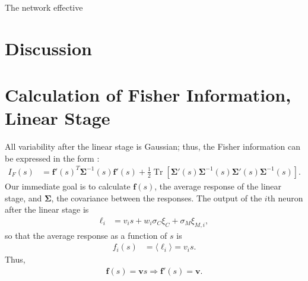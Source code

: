 \documentclass[11pt]{article}
\DeclareMathOperator{\Tr}{Tr}
\begin{document}
	The network effective

	\begin{figure}[b]
		\centering
		\caption{} 
	\end{figure}	
	\newpage
	\section{Discussion}
	

	\newpage
	\printbibliography

	\newpage
	
	\appendix
	\section{Calculation of  Fisher Information, Linear Stage}\label{app:fisher-linear}
	All variability after the linear stage is Gaussian; thus, the Fisher information can be expressed in the form \cite{1999abbott_dayan, 1993kay}:
	\begin{align}
		I_{F}(s) &= \mathbf{f}'(s)^T \boldsymbol{\Sigma}^{-1} (s) \mathbf{f}'(s) + \frac{1}{2}\Tr\left[\boldsymbol{\Sigma}'(s) \boldsymbol{\Sigma}^{-1}(s)\boldsymbol{\Sigma}'(s) \boldsymbol{\Sigma}^{-1}(s)\right]. \label{IF-gaussian}
	\end{align}
	Our immediate goal is to calculate $\mathbf{f}(s)$, the average response of the linear stage, and $\boldsymbol{\Sigma}$, the covariance between the responses. The output of the $i$th neuron after the linear stage is
	\begin{align}
		\ell_i &= v_i s + w_i \sigma_C \xi_C + \sigma_M\xi_{M,i},
	\end{align}
	so that the average response as a function of $s$ is
	\begin{align}
		f_i(s) &= \langle \ell_i \rangle = v_i s.
	\end{align}
	Thus,
	\begin{align}
		\mathbf{f}(s) = \mathbf{v}s \Rightarrow \mathbf{f}'(s) = \mathbf{v}.
	\end{align}
	
\end{document}

